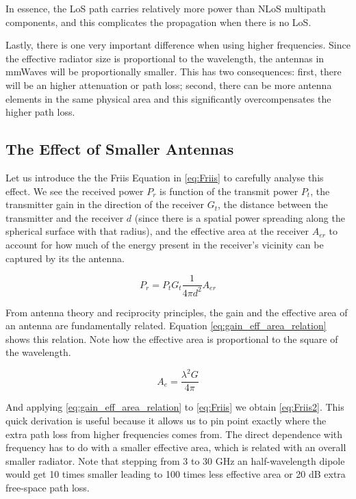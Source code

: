 In essence, the \ac{LoS} path carries relatively more power than \ac{NLoS} multipath components, and this complicates the propagation when there is no \ac{LoS}.

Lastly, there is one very important difference when using higher frequencies. Since the effective radiator size is proportional to the wavelength, the antennas in mmWaves will be proportionally smaller. This has two consequences: first, there will be an higher attenuation or path loss; second, there can be more antenna elements in the same physical area and this significantly overcompensates the higher path loss.



\subsection*{The Effect of Smaller Antennas}

Let us introduce the the Friis Equation in \eqref{eq:Friis} to carefully analyse this effect. We see the received power $P_r$ is function of the transmit power $P_t$, the transmitter gain in the direction of the receiver $G_t$, the distance between the transmitter and the receiver $d$ (since there is a spatial power spreading along the spherical surface with that radius), and the effective area at the receiver $A_{er}$ to account for how much of the energy present in the receiver's vicinity can be captured by its the antenna.

\begin{equation} \label{eq:Friis}
    P_r = P_t G_t \frac{1}{4\pi d^2} A_{er}
\end{equation}

From antenna theory and reciprocity principles, the gain and the effective area of an antenna are fundamentally related. Equation \eqref{eq:gain_eff_area_relation} shows this relation. Note how the effective area is proportional to the square of the wavelength. 

\begin{equation} \label{eq:gain_eff_area_relation}
    A_e = \frac{\lambda^2 G}{4 \pi}
\end{equation}

And applying \eqref{eq:gain_eff_area_relation} to \eqref{eq:Friis} we obtain \eqref{eq:Friis2}. This quick derivation is useful because it allows us to pin point exactly where the extra path loss from higher frequencies comes from. The direct dependence with frequency has to do with a smaller effective area, which is related with an overall smaller radiator. Note that stepping from 3 to 30 GHz an half-wavelength dipole would get 10 times smaller leading to 100 times less effective area or 20 dB extra free-space path loss.

